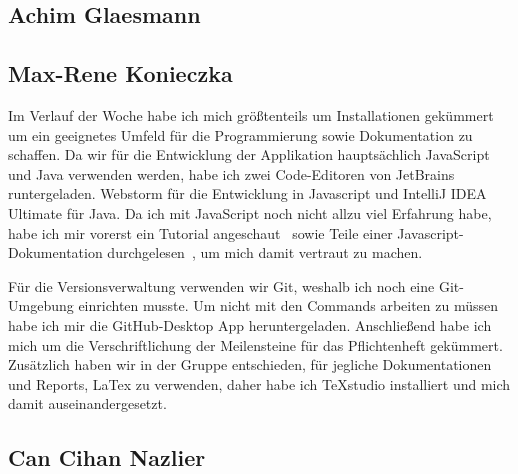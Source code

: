 \documentclass[]{article}
\begin{document}
\subsection{Achim Glaesmann}

\subsection{Max-Rene Konieczka}
Im Verlauf der Woche habe ich mich größtenteils um Installationen gekümmert um ein geeignetes Umfeld für die Programmierung sowie Dokumentation zu schaffen. Da wir für die Entwicklung der Applikation hauptsächlich JavaScript und Java verwenden werden, habe ich zwei Code-Editoren von JetBrains runtergeladen. Webstorm für die Entwicklung in Javascript und IntelliJ IDEA Ultimate für Java. Da ich mit JavaScript noch nicht allzu viel Erfahrung habe, habe ich mir vorerst ein Tutorial angeschaut~\cite{javascript_tut} sowie Teile einer Javascript-Dokumentation durchgelesen~\cite{javascript_doc}, um mich damit vertraut zu machen.

Für die Versionsverwaltung verwenden wir Git, weshalb ich noch eine Git-Umgebung einrichten musste. Um nicht mit den Commands arbeiten zu müssen habe ich mir die GitHub-Desktop App heruntergeladen. 
Anschließend habe ich mich um die Verschriftlichung der Meilensteine für das Pflichtenheft gekümmert. Zusätzlich haben wir in der Gruppe entschieden, für jegliche Dokumentationen und Reports, LaTex zu verwenden, daher habe ich TeXstudio installiert und mich damit auseinandergesetzt. 

\subsection{Can Cihan Nazlier}
	

\printbibliography
\end{document}
